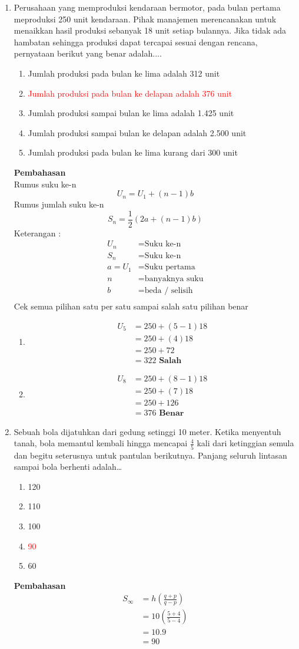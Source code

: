 \documentclass{report}
\newcommand{\options}[5]{
\begin{enumerate}[label=\alph*.]
	\item #1
	\item #2
	\item #3
	\item #4
	\item #5
\end{enumerate}
}
\newcommand{\pemb}{ \textbf{Pembahasan} \\}
\begin{document}
\begin{enumerate}
\item Perusahaan yang memproduksi kendaraan bermotor, pada bulan pertama meproduksi 250 unit kendaraan. Pihak manajemen merencanakan untuk menaikkan hasil produksi sebanyak 18 unit setiap bulannya. Jika tidak ada hambatan sehingga produksi dapat tercapai sesuai dengan rencana, pernyataan berikut yang benar adalah....
\options
{Jumlah produksi pada bulan ke lima adalah 312 unit}
{\textcolor{red}{Jumlah produksi pada bulan ke delapan adalah 376 unit}}
{Jumlah produksi sampai bulan ke lima adalah 1.425 unit}
{Jumlah produksi sampai bulan ke delapan adalah 2.500 unit}
{Jumlah produksi pada bulan ke lima kurang dari 300 unit}
\pemb
Rumus suku ke-n
\begin{equation}
	U_{n} = U_{1}+(n-1)b
\end{equation}
Rumus jumlah suku ke-n
\begin{equation}
	S_{n} = \frac{1}{2}\left(2a+(n-1)b\right)
\end{equation}
Keterangan :
\begin{align*}
	    U_{n} &= \text{Suku ke-n} \\
	    S_{n} &= \text{Suku ke-n} \\
	a = U_{1} &= \text{Suku pertama} \\
		n &= \text{banyaknya suku} \\
		b &= \text{beda / selisih}\\
\end{align*}
Cek semua pilihan satu per satu sampai salah satu pilihan benar
\begin{enumerate}[label=(\alph*)]
	\item \begin{align*}
			U_{5}&=250+(5-1)18 \\
			     &=250+(4)18 \\
			     &=250+72 \\
			     &=322 \textbf{	Salah}
		\end{align*}
	\item \begin{align*}
			U_{8}&=250+(8-1)18 \\
			     &=250+(7)18 \\
			     &=250+126 \\
			     &=376 \textbf{	Benar}
		\end{align*}
\end{enumerate}

\item Sebuah bola dijatuhkan dari gedung setinggi 10 meter. Ketika menyentuh tanah, bola memantul kembali hingga mencapai $\frac{4}{5}$ kali dari ketinggian semula dan begitu seterusnya untuk pantulan berikutnya. Panjang seluruh lintasan sampai bola berhenti adalah\ldots
\options
{120}
{110}
{100}
{\textcolor{red}{90}}
{60}
\pemb
\begin{align*}
	S_{\infty} &= h \left(\frac{q+p}{q-p}\right) \\
		   &= 10 \left(\frac{5+4}{5-4}\right) \\
		   &= 10.9 \\
		   &= 90 \\
\end{align*}


\end{enumerate}
\end{document}

